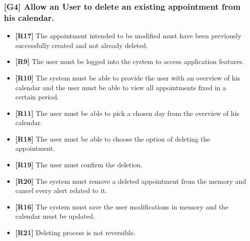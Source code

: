 \subsubsection{[G4] Allow an User to delete an existing appointment from his calendar.}
	\begin{itemize}
		\item \textbf{[R17]} The appointment intended to be modified must have been previously successfully created and not already deleted.
		\item \textbf{[R9]} The user must be logged into the system to access application features.
		\item \textbf{[R10]} The system must be able to provide the user with an overview of his calendar and the user must be able to view all appointments fixed in a certain period.
		\item \textbf{[R11]} The user must be able to pick a chosen day from the overview of his calendar.
		\item \textbf{[R18]} The user must be able to choose the option of deleting the appointment.
		\item \textbf{[R19]} The user must confirm the deletion.
		\item \textbf{[R20]} The system must remove a deleted appointment from the memory and cancel every alert related to it.
		\item \textbf{[R16]} The system must save the user modifications in memory and the calendar must be updated.
		\item \textbf{[R21]} Deleting process is not reversible.
		
	\end{itemize}
